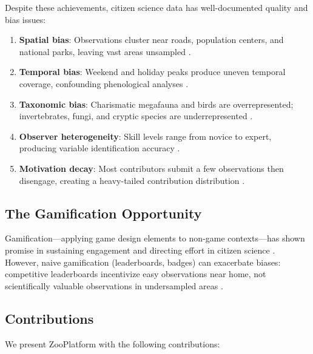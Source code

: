\documentclass[11pt,a4paper]{article}
\begin{document}
Despite these achievements, citizen science data has well-documented
quality and bias issues:

\begin{enumerate}[label=(\roman*)]
  \item \textbf{Spatial bias}: Observations cluster near roads,
    population centers, and national parks, leaving vast areas
    unsampled \citep{boakes2010distorted}.
  \item \textbf{Temporal bias}: Weekend and holiday peaks produce
    uneven temporal coverage, confounding phenological analyses
    \citep{courter2013weekend}.
  \item \textbf{Taxonomic bias}: Charismatic megafauna and birds are
    overrepresented; invertebrates, fungi, and cryptic species are
    underrepresented \citep{troudet2017taxonomic}.
  \item \textbf{Observer heterogeneity}: Skill levels range from novice
    to expert, producing variable identification accuracy
    \citep{kelling2015can}.
  \item \textbf{Motivation decay}: Most contributors submit a few
    observations then disengage, creating a heavy-tailed contribution
    distribution \citep{sauermann2015crowd}.
\end{enumerate}

\subsection{The Gamification Opportunity}

Gamification---applying game design elements to non-game contexts---has
shown promise in sustaining engagement and directing effort in citizen
science \citep{bowser2013gamifying, eveleigh2014designing}. However,
naive gamification (leaderboards, badges) can exacerbate biases:
competitive leaderboards incentivize easy observations near home, not
scientifically valuable observations in undersampled areas
\citep{crowston2020citizen}.

\subsection{Contributions}

We present ZooPlatform with the following contributions:
\end{document}
